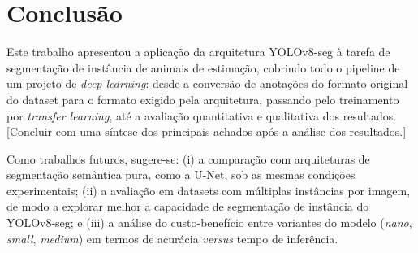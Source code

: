\documentclass[12pt]{article}
\begin{document}
\section{Conclusão}
\label{sec:conclusao}

Este trabalho apresentou a aplicação da arquitetura YOLOv8-seg à tarefa de segmentação de
instância de animais de estimação, cobrindo todo o pipeline de um projeto de \textit{deep
learning}: desde a conversão de anotações do formato original do dataset para o formato
exigido pela arquitetura, passando pelo treinamento por \textit{transfer learning}, até a
avaliação quantitativa e qualitativa dos resultados. [Concluir com uma síntese dos principais
achados após a análise dos resultados.]

Como trabalhos futuros, sugere-se: (i) a comparação com arquiteturas de segmentação semântica
pura, como a U-Net, sob as mesmas condições experimentais; (ii) a avaliação em datasets com
múltiplas instâncias por imagem, de modo a explorar melhor a capacidade de segmentação de
instância do YOLOv8-seg; e (iii) a análise do custo-benefício entre variantes do modelo
(\textit{nano}, \textit{small}, \textit{medium}) em termos de acurácia \textit{versus} tempo
de inferência.




\end{document}
